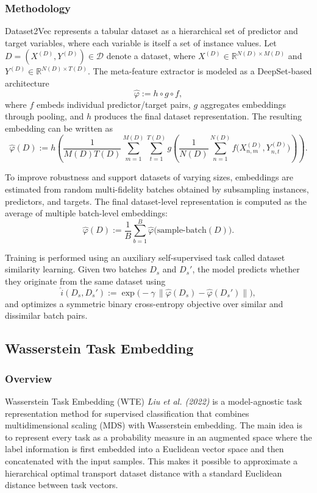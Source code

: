 \documentclass[peerreview]{IEEEtran}
\begin{document}
\subsubsection*{Methodology}
Dataset2Vec represents a tabular dataset as a hierarchical set of predictor and target variables, where each variable is itself a set of instance values. Let
$D = (X^{(D)}, Y^{(D)}) \in \mathcal{D}$ denote a dataset, where
$X^{(D)} \in \mathbb{R}^{N(D)\times M(D)}$ and
$Y^{(D)} \in \mathbb{R}^{N(D)\times T(D)}$.
The meta-feature extractor is modeled as a DeepSet-based architecture
\begin{equation}
    \hat{\varphi} := h \circ g \circ f,
\end{equation}
where $f$ embeds individual predictor/target pairs, $g$ aggregates embeddings through pooling, and $h$ produces the final dataset representation. The resulting embedding can be written as
\begin{equation}
\hat{\varphi}(D)
:=
h\left(
\frac{1}{M(D)T(D)}
\sum_{m=1}^{M(D)} \sum_{t=1}^{T(D)}
g\left(
\frac{1}{N(D)}
\sum_{n=1}^{N(D)}
f\bigl(X^{(D)}_{n,m}, Y^{(D)}_{n,t}\bigr)
\right)
\right).
\end{equation}

To improve robustness and support datasets of varying sizes, embeddings are estimated from random multi-fidelity batches obtained by subsampling instances, predictors, and targets. The final dataset-level representation is computed as the average of multiple batch-level embeddings:
\begin{equation}
    \hat{\varphi}(D)
    := \frac{1}{B} \sum_{b=1}^{B}
    \hat{\varphi}\bigl(\mathrm{sample\text{-}batch}(D)\bigr).
\end{equation}

Training is performed using an auxiliary self-supervised task called dataset similarity learning. Given two batches $D_s$ and $D_s'$, the model predicts whether they originate from the same dataset using
\begin{equation}
    \hat{i}(D_s, D_s')
    := \exp\bigl(-\gamma\,\|\hat{\varphi}(D_s) - \hat{\varphi}(D_s')\|\bigr),
\end{equation}
and optimizes a symmetric binary cross-entropy objective over similar and dissimilar batch pairs.
\subsection{Wasserstein Task Embedding}

\subsubsection*{Overview}
Wasserstein Task Embedding (WTE) \emph{Liu et al. (2022)} is a
model-agnostic task representation method for supervised
classification that combines multidimensional scaling (MDS) with
Wasserstein embedding. The main idea is to represent every task as a
probability measure in an augmented space where the label information
is first embedded into a Euclidean vector space and then concatenated
with the input samples. This makes it possible to approximate a
hierarchical optimal transport dataset distance with a standard
Euclidean distance between task vectors.
\end{document}
